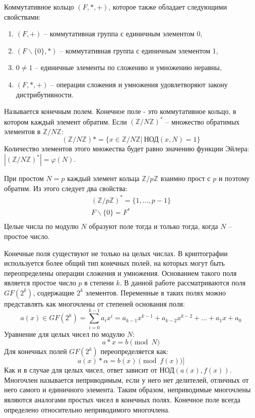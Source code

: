 \documentclass[times,specification,annotation]{itmo-student-thesis}
\begin{document}
Коммутативное кольцо $(F,*,+)$, которое также обладает следующими свойствами:
\begin{enumerate}[label=\arabic*.]
    \item $(F,+)$ -- коммутативная группа с единичным элементом 0,
    \item $(F \backslash \{0\},*)$ -- коммутативная группа с единичным элементом 1,
    \item $0\neq1$ -- единичные элементы по сложению и умножению неравны,
    \item $(F,*,+)$ -- операции сложения и умножения удовлетворяют закону дистрибутивности.
\end{enumerate}
Называется конечным полем.
Конечное поле - это коммутативное кольцо, в котором каждый элемент обратим.
Если $(\mathbb{Z}/N\mathbb{Z})^*$ -- множество обратимых элементов в $\mathbb{Z}/N\mathbb{Z}$:
\[(\mathbb{Z}/N\mathbb{Z})* = \{x \in \mathbb{Z}/N\mathbb{Z} | ~ \text{НОД}(x, N) = 1\}\]
Количество элементов этого множества будет равно значению функции Эйлера:
$|(\mathbb{Z}/N\mathbb{Z})^*| = \varphi (N)$.

При простом $N=p$ каждый элемент кольца $\mathbb{Z}/p\mathbb{Z}$ взаимно прост с $p$ и поэтому обратим.
Из этого следует два свойства:
\begin{gather*}
    (\mathbb{Z}/p\mathbb{Z})^* = \{1, \dots, p-1\}\\
    F \backslash \{0\} = F^*\\
\end{gather*}
Целые числа по модулю $N$ образуют поле тогда и только тогда, когда $N$ -- простое число.

Конечные поля существуют не только на целых числах.
В криптографии используется более общий тип конечных полей, на которых могут быть переопределены операции сложения и умножения.
Основанием такого поля является простое число $p$ в степени $k$.
В данной работе рассматриваются поля $GF (2^k)$, содержащие $2^k$ элементов.
Переменные в таких полях можно представлять как многочлены от степеней основания поля:
\[a(x) \in GF(2^k) = \sum_{i=0}^{k-1}a_i x^i = a_{k-1}x^{k-1} + a_{k-2}x^{k-2} + \dots + a_1 x + a_0\]
Уравнение для целых чисел по модулю $N$:
\[a*x = b \pmod{N}\]
Для конечных полей $GF(2^k)$ переопределяется как:
\[a(x)*\alpha = b(x) \pmod{f(x)}]\]
Как и в случае для целых чисел, ответ зависит от НОД$(a(x), f(x))$.
Многочлен называется неприводимым, если у него нет делителей, отличных от него самого и единичного элемента.
Таким образом, неприводимые многочлены являются аналогами простых чисел в конечных полях.
Конечное поле всегда определено относительно неприводимого многочлена.
\end{document}
